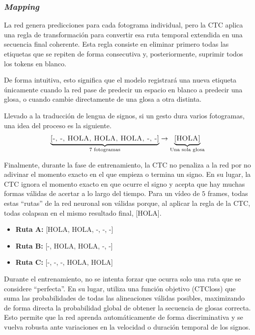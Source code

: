 \subsubsection*{\textit{Mapping}}
La red genera predicciones para cada fotograma individual, pero la CTC aplica una regla de transformación para convertir esa ruta temporal extendida en una secuencia final coherente.
Esta regla consiste en eliminar primero todas las etiquetas que se repiten de forma consecutiva y, posteriormente, suprimir todos los tokens en blanco.

De forma intuitiva, esto significa que el modelo registrará una nueva etiqueta únicamente cuando la red pase de predecir un espacio en blanco a predecir una glosa, o cuando cambie directamente de una glosa a otra distinta.

Llevado a la traducción de lengua de signos, si un gesto dura varios fotogramas, una idea del proceso es la siguiente.
\begin{equation*}
\underbrace{\textsc{[-, -, HOLA, HOLA, HOLA, -, -]}}_{7\text{ fotogramas}} \rightarrow \underbrace{\textsc{[HOLA]}}_{\text{Una sola glosa}}
\end{equation*}

Finalmente, durante la fase de entrenamiento, la CTC no penaliza a la red por no adivinar el momento exacto en el que empieza o termina un signo.
En su lugar, la CTC ignora el momento exacto en que ocurre el signo y acepta que hay muchas formas válidas de acertar a lo largo del tiempo.
Para un vídeo de $5$ frames, todas estas ``rutas'' de la red neuronal son válidas porque, al aplicar la regla de la CTC, todas colapsan en el mismo resultado final, \textsc{[HOLA]}.
\begin{itemize}
    \item \textbf{Ruta A:} \textsc{[HOLA, HOLA, -, -, -]}
    \item \textbf{Ruta B:} \textsc{[-, HOLA, HOLA, -, -]}
    \item \textbf{Ruta C:} \textsc{[-, -, -, HOLA, HOLA]}
\end{itemize}

Durante el entrenamiento, no se intenta forzar que ocurra solo una ruta que se considere ``perfecta''.
En su lugar, utiliza una función objetivo (CTCloss) que suma las probabilidades de todas las alineaciones válidas posibles, maximizando de forma directa la probabilidad global de obtener la secuencia de glosas correcta.
Esto permite que la red aprenda automáticamente de forma discriminativa y se vuelva robusta ante variaciones en la velocidad o duración temporal de los signos.

